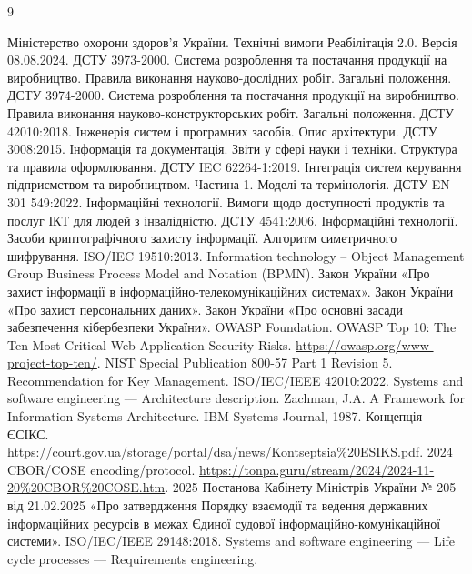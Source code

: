 \documentclass{article}
\begin{document}
\begin{thebibliography}{9}

 Міністерство охорони здоров’я України. \newblock Технічні вимоги Реабілітація 2.0. \newblock Версія 08.08.2024.
 ДСТУ 3973-2000. \newblock Система розроблення та постачання продукції на виробництво. Правила виконання науково-дослідних робіт. Загальні положення.
 ДСТУ 3974-2000. \newblock Система розроблення та постачання продукції на виробництво. Правила виконання науково-конструкторських робіт. Загальні положення.
 ДСТУ 42010:2018. \newblock Інженерія систем і програмних засобів. Опис архітектури.
 ДСТУ 3008:2015. \newblock Інформація та документація. Звіти у сфері науки і техніки. Структура та правила оформлювання.
 ДСТУ IEC 62264-1:2019. \newblock Інтеграція систем керування підприємством та виробництвом. Частина 1. Моделі та термінологія.
 ДСТУ EN 301 549:2022. \newblock Інформаційні технології. Вимоги щодо доступності продуктів та послуг ІКТ для людей з інвалідністю.
 ДСТУ 4541:2006. \newblock Інформаційні технології. Засоби криптографічного захисту інформації. Алгоритм симетричного шифрування.
 ISO/IEC 19510:2013. \newblock Information technology -- Object Management Group Business Process Model and Notation (BPMN).
 Закон України «Про захист інформації в інформаційно-телекомунікаційних системах».
 Закон України «Про захист персональних даних».
 Закон України «Про основні засади забезпечення кібербезпеки України».
 OWASP Foundation. \newblock OWASP Top 10: The Ten Most Critical Web Application Security Risks. \newblock \url{https://owasp.org/www-project-top-ten/}.
 NIST Special Publication 800-57 Part 1 Revision 5. \newblock Recommendation for Key Management.
 ISO/IEC/IEEE 42010:2022. \newblock Systems and software engineering — Architecture description.
 Zachman, J.A. \newblock A Framework for Information Systems Architecture. \newblock IBM Systems Journal, 1987.
 Концепція ЄСІКС. \url{https://court.gov.ua/storage/portal/dsa/news/Kontseptsia%20ESIKS.pdf}. 2024
 CBOR/COSE encoding/protocol. \url{https://tonpa.guru/stream/2024/2024-11-20%20CBOR%20COSE.htm}. 2025
 Постанова Кабінету Міністрів України № 205 від 21.02.2025 «Про затвердження Порядку взаємодії та ведення державних інформаційних ресурсів в межах Єдиної судової інформаційно-комунікаційної системи».
 ISO/IEC/IEEE 29148:2018. \newblock Systems and software engineering — Life cycle processes — Requirements engineering.

\end{thebibliography}
\end{document}
